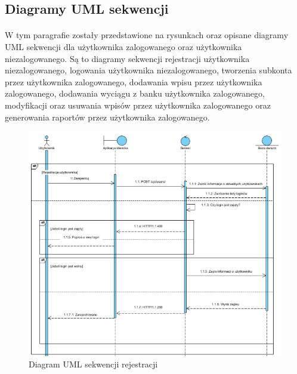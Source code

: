 \documentclass{article}
\begin{document}
	\subsection{Diagramy UML sekwencji}
	\paragraph*{} W tym paragrafie zostały przedstawione na rysunkach oraz opisane diagramy UML sekwencji dla użytkownika zalogowanego oraz użytkownika niezalogowanego. Są to diagramy sekwencji rejestracji użytkownika niezalogowanego, logowania użytkownika niezalogowanego, tworzenia subkonta przez użytkownika zalogowanego, dodawania wpisu przez użytkownika zalogowanego, dodawania wyciągu z banku użytkownika zalogowanego, modyfikacji oraz usuwania wpisów przez użytkownika zalogowanego oraz generowania raportów przez użytkownika zalogowanego.
	\begin{figure}[H]
		\hspace*{-2.5cm} 
		\includegraphics[scale=0.9]{assets/sq1.png}
		\caption[]{Diagram UML sekwencji rejestracji}
		\label{fig:umlreje}
	\end{figure} 
\end{document}
